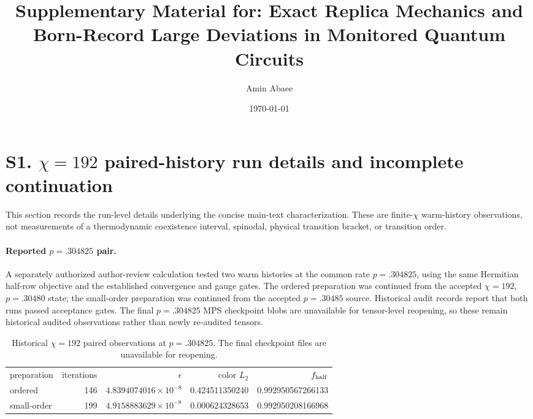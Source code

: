 \documentclass[aps,prx,onecolumn,nofootinbib]{revtex4-2}
\begin{document}
\title{Supplementary Material for: Exact Replica Mechanics and Born-Record Large Deviations in Monitored Quantum Circuits}
\author{Amin Abaee}
\date{\today}
\maketitle

\section*{S1. $\chi=192$ paired-history run details and incomplete continuation}
\label{sec:supp-chi192}

This section records the run-level details underlying the concise main-text characterization. These are finite-$\chi$ warm-history observations, not measurements of a thermodynamic coexistence interval, spinodal, physical transition bracket, or transition order.

\paragraph{Reported $p=.304825$ pair.} A separately authorized author-review calculation tested two warm histories at the common rate $p=.304825$, using the same Hermitian half-row objective and the established convergence and gauge gates. The ordered preparation was continued from the accepted $\chi=192$, $p=.30480$ state; the small-order preparation was continued from the accepted $p=.30485$ source. Historical audit records report that both runs passed acceptance gates. The final $p=.304825$ MPS checkpoint blobs are unavailable for tensor-level reopening, so these remain historical audited observations rather than newly re-audited tensors.

\begin{table}[h]
\caption{Historical $\chi=192$ paired observations at $p=.304825$. The final checkpoint files are unavailable for reopening.}
\begin{ruledtabular}
\begin{tabular}{lrrrr}
preparation & iterations & $\epsilon$ & color $L_2$ & $f_{\rm half}$\\
\colrule
ordered & 146 & $4.8394074016\times10^{-8}$ & 0.424511350240 & 0.992950567266133\\
small-order & 199 & $4.9158883629\times10^{-8}$ & 0.000624328653 & 0.992950208166968\\
\end{tabular}
\end{ruledtabular}
\end{table}
\end{document}

